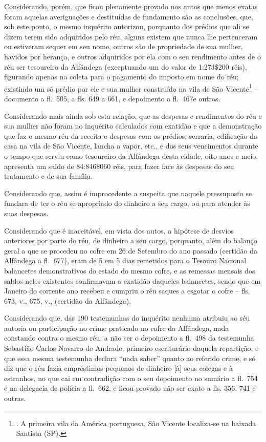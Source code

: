 Considerando, porém, que ficou plenamente provado nos autos que menos
exatas foram aquelas averiguações e destituídas de fundamento são as
conclusões, que, sob este ponto, o mesmo inquérito autorizou, porquanto
dos prédios que ali se dizem terem sido adquiridos pelo réu, alguns
existem que nunca lhe pertenceram ou estiveram sequer em seu nome,
outros são de propriedade de sua mulher, havidos por herança, e outros
adquiridos por ela com o seu rendimento antes de o réu ser tesoureiro da
Alfândega (exceptuando um do valor de 1:273\$200 réis), figurando apenas
na coleta para o pagamento do imposto em nome do réu; existindo um só
prédio por ele e sua mulher construído na vila de São Vicente\footnote{.
  A primeira vila da América portuguesa, São Vicente localiza-se na
  baixada Santista (SP).} -- documento a fl.~505, a fls. 649 a 661, e
depoimento a fl.~467e outros.

Considerando mais ainda sob esta relação, que as despesas e rendimentos
do réu e sua mulher não foram no inquérito calculados com exatidão e que
a demonstração que faz o mesmo réu da receita e despesas com os prédios,
serraria, edificação da casa na vila de São Vicente, lancha a vapor,
etc., e dos seus vencimentos durante o tempo que serviu como tesoureiro
da Alfândega desta cidade, oito anos e meio, apresenta um saldo de
84:846\$060 réis, para fazer face às despesas do seu tratamento e de sua
família.

Considerando que, assim é improcedente a suspeita que naquele
pressuposto se fundara de ter o réu se apropriado do dinheiro a seu
cargo, ou para atender às suas despesas.

Considerando que é inaceitável, em vista dos autos, a hipótese de
desvios anteriores por parte do réu, de dinheiro a seu cargo, porquanto,
além do balanço geral a que se procedeu no cofre em 26 de Setembro do
ano passado (certidão da Alfândega a fl.~677), eram de 5 em 5 dias
remetidos para o Tesouro Nacional balancetes demonstrativos do estado do
mesmo cofre, e as remessas mensais dos saldos neles existentes
confirmavam a exatidão daqueles balancetes, sendo que em Janeiro do
corrente ano recebeu e cumpriu o réu saques a esgotar o cofre -- fls.
673, v., 675, v., (certidão da Alfândega).

Considerando que, das 190 testemunhas do inquérito nenhuma atribuiu ao
réu autoria ou participação no crime praticado no cofre da Alfândega,
nada constando contra o mesmo réu, a não ser o depoimento a fl.~498 da
testemunha Sebastião Carlos Navarro de Andrade, primeiro escriturário
daquela repartição, e que essa mesma testemunha declara ``nada saber''
quanto ao referido crime, e só diz que o réu fazia empréstimos pequenos
de dinheiro {[}à{]} seus colegas e à estranhos, no que cai em
contradição com o seu depoimento no sumário a fl.~754 e na delegacia de
polícia a fl.~662, e ficou provado não ser exato a fls. 356, 741 e
outras.

